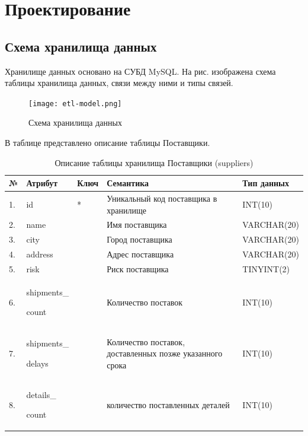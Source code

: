 \section{Проектирование}
\subsection{Схема хранилища данных}
Хранилище данных основано на СУБД MySQL. На рис.  изображена схема таблицы хранилища данных, связи между ними и типы связей.

\begin{figure}[h]
  \centering
  \texttt{[image: etl-model.png]}
  \caption{Схема хранилища данных}
  \label{etl-diagram}
\end{figure}

В таблице  представлено описание таблицы Поставщики.
\begin{table}[h]
	\caption{\space Описание таблицы хранилища Поставщики (suppliers)}
	\label{etl-suppliers}
	\begin{tabular}{|p{0.4cm}|p{2.5cm}|p{1.5cm}|p{6.3cm}|p{3.2cm}|}
		\hline
		\textbf{№} & \textbf{Атрибут} & \textbf{Ключ} & \textbf{Семантика} & \textbf{Тип данных} \\
		\hline
		1. & id & * & Уникальный код поставщика в хранилище & INT(10) \\
		\hline
		2. & name & & Имя поставщика & VARCHAR(20) \\
		\hline
		3. & city & & Город поставщика & VARCHAR(20) \\
		\hline
		4. & address & & Адрес поставщика & VARCHAR(20) \\
		\hline
		5. & risk & & Риск поставщика & TINYINT(2) \\
		\hline
		6. & shipments\_\par count & & Количество поставок & INT(10) \\
		\hline
		7. & shipments\_\par delays & & Количество поставок, доставленных позже указанного срока & INT(10) \\
		\hline
		8. & details\_\par count & & количество поставленных деталей & INT(10) \\
		\hline
	\end{tabular}
\end{table}

